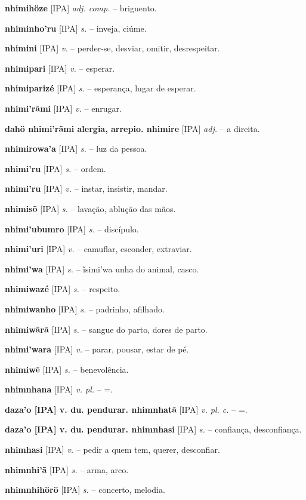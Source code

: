 \textbf{nhimihöze} [IPA] \textit{adj. comp.} -- briguento.

\textbf{nhiminho'ru} [IPA] \textit{s.} -- inveja, ciúme.

\textbf{nhimini} [IPA] \textit{v.} -- perder-se, desviar, omitir, desrespeitar.

\textbf{nhimipari} [IPA] \textit{v.} -- esperar.

\textbf{nhimiparizé} [IPA] \textit{s.} -- esperança, lugar de esperar.

\textbf{nhimi'rãmi} [IPA] \textit{v.} -- enrugar.

\textbf{dahö nhimi'rãmi alergia, arrepio. nhimire} [IPA] \textit{adj.} -- a direita.

\textbf{nhimirowa'a} [IPA] \textit{s.} -- luz da pessoa.

\textbf{nhimi'ru} [IPA] \textit{s.} -- ordem.

\textbf{nhimi'ru} [IPA] \textit{v.} -- instar, insistir, mandar.

\textbf{nhimisõ} [IPA] \textit{s.} -- lavação, ablução das mãos.

\textbf{nhimi'ubumro} [IPA] \textit{s.} -- discípulo.

\textbf{nhimi'uri} [IPA] \textit{v.} -- camuflar, esconder, extraviar.

\textbf{nhimi'wa} [IPA] \textit{s.} -- ĩsimi'wa unha do animal, casco.

\textbf{nhimiwazé} [IPA] \textit{s.} -- respeito.

\textbf{nhimiwanho} [IPA] \textit{s.} -- padrinho, afilhado.

\textbf{nhimiwãrã} [IPA] \textit{s.} -- sangue do parto, dores de parto.

\textbf{nhimi'wara} [IPA] \textit{v.} -- parar, pousar, estar de pé.

\textbf{nhimiwẽ} [IPA] \textit{s.} -- benevolência.

\textbf{nhimnhana} [IPA] \textit{v. pl.} -- =.

\textbf{daza'o [IPA] v. du. pendurar. nhimnhatã} [IPA] \textit{v. pl. c.} -- =.

\textbf{daza'o [IPA] v. du. pendurar. nhimnhasi} [IPA] \textit{s.} -- confiança, desconfiança.

\textbf{nhimhasi} [IPA] \textit{v.} -- pedir a quem tem, querer, desconfiar.

\textbf{nhimnhi'ã} [IPA] \textit{s.} -- arma, arco.

\textbf{nhimnhihörö} [IPA] \textit{s.} -- concerto, melodia.

